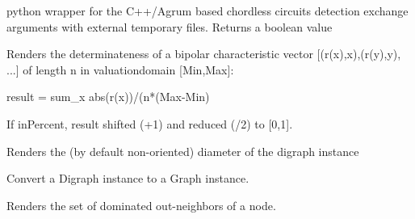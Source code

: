 \documentclass[letterpaper,10pt,english]{sphinxmanual}
\begin{document}
\begin{fulllineitems}
\begin{fulllineitems}
\label{techDoc:digraphs.Digraph.detectCppChordlessCircuits}
python wrapper for the C++/Agrum based chordless circuits detection
exchange arguments with external temporary files.
Returns a boolean value

\end{fulllineitems}


\begin{fulllineitems}
\label{techDoc:digraphs.Digraph.determinateness}
Renders the determinateness of a bipolar characteristic vector
{[}(r(x),x),(r(y),y), ...{]} of length n in valuationdomain {[}Min,Max{]}:

result = sum\_x abs(r(x))/(n*(Max-Min)

If inPercent, result shifted (+1) and reduced (/2) to {[}0,1{]}.

\end{fulllineitems}


\begin{fulllineitems}
\label{techDoc:digraphs.Digraph.diameter}
Renders the (by default non-oriented) diameter of the digraph instance

\end{fulllineitems}


\begin{fulllineitems}
\label{techDoc:digraphs.Digraph.digraph2Graph}
Convert a Digraph instance to a Graph instance.

\end{fulllineitems}


\begin{fulllineitems}
\label{techDoc:digraphs.Digraph.dneighbors}
Renders the set of dominated out-neighbors of a node.


\end{fulllineitems}
\end{fulllineitems}
\end{document}
